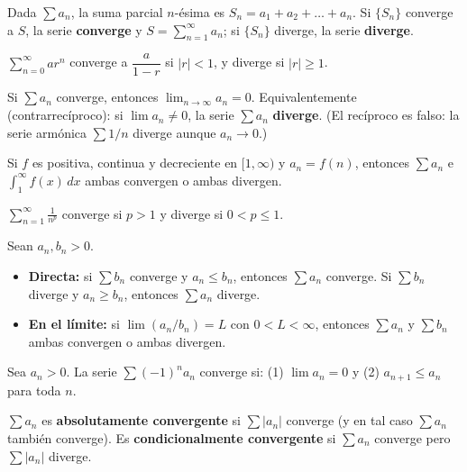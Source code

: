 \documentclass[11pt,a4paper]{article}
\begin{document}
\begin{defi}
Dada $\sum a_n$, la suma parcial $n$-ésima es $S_n=a_1+a_2+\dots+a_n$. Si $\{S_n\}$ converge a $S$, la serie \textbf{converge} y $S=\sum_{n=1}^\infty a_n$; si $\{S_n\}$ diverge, la serie \textbf{diverge}.
\end{defi}

\begin{teo}
$\displaystyle\sum_{n=0}^\infty ar^n$ converge a $\dfrac{a}{1-r}$ si $|r|<1$, y diverge si $|r|\ge1$.
\end{teo}

\begin{teo}
Si $\sum a_n$ converge, entonces $\lim_{n\to\infty}a_n=0$. Equivalentemente (contrarrecíproco): si $\lim a_n\ne0$, la serie $\sum a_n$ \textbf{diverge}. (El recíproco es falso: la serie armónica $\sum 1/n$ diverge aunque $a_n\to0$.)
\end{teo}

\begin{teo}
Si $f$ es positiva, continua y decreciente en $[1,\infty)$ y $a_n=f(n)$, entonces $\sum a_n$ e $\int_1^\infty f(x)\,dx$ ambas convergen o ambas divergen.
\end{teo}

\begin{teo}[Series $p$]
$\displaystyle\sum_{n=1}^\infty \frac1{n^p}$ converge si $p>1$ y diverge si $0<p\le1$.
\end{teo}

\begin{teo}
Sean $a_n,b_n>0$.
\begin{itemize}
    \item \textbf{Directa:} si $\sum b_n$ converge y $a_n\le b_n$, entonces $\sum a_n$ converge. Si $\sum b_n$ diverge y $a_n\ge b_n$, entonces $\sum a_n$ diverge.
    \item \textbf{En el límite:} si $\lim (a_n/b_n)=L$ con $0<L<\infty$, entonces $\sum a_n$ y $\sum b_n$ ambas convergen o ambas divergen.
\end{itemize}
\end{teo}

\begin{teo}
Sea $a_n>0$. La serie $\sum(-1)^n a_n$ converge si: (1) $\lim a_n=0$ y (2) $a_{n+1}\le a_n$ para toda $n$.
\end{teo}

\begin{defi}
$\sum a_n$ es \textbf{absolutamente convergente} si $\sum|a_n|$ converge (y en tal caso $\sum a_n$ también converge). Es \textbf{condicionalmente convergente} si $\sum a_n$ converge pero $\sum|a_n|$ diverge.
\end{defi}
\end{document}
